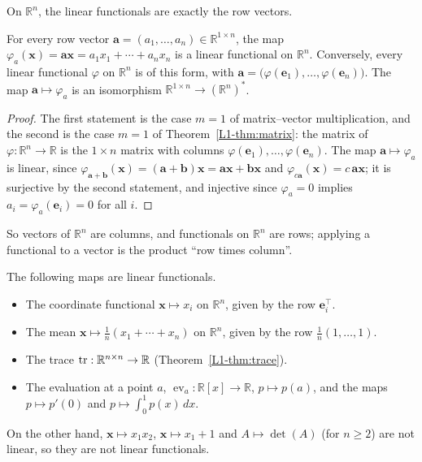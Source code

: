 On $\mathbb{R}^n$, the linear functionals are exactly the row vectors.

\begin{proposition}\label{L1-prop:functionals-rn}
    For every row vector $\mathbf{a} = (a_1, \ldots, a_n) \in \mathbb{R}^{1 \times n}$, the map $\varphi_a(\mathbf{x}) = \mathbf{a}\mathbf{x} = a_1 x_1 + \cdots + a_n x_n$ is a linear functional on $\mathbb{R}^n$. Conversely, every linear functional $\varphi$ on $\mathbb{R}^n$ is of this form, with $\mathbf{a} = \big(\varphi(\mathbf{e}_1), \ldots, \varphi(\mathbf{e}_n)\big)$. The map $\mathbf{a} \mapsto \varphi_a$ is an isomorphism $\mathbb{R}^{1 \times n} \to (\mathbb{R}^n)^*$.
\end{proposition}

\begin{proof}
    The first statement is the case $m = 1$ of matrix--vector multiplication, and the second is the case $m = 1$ of Theorem~\ref{L1-thm:matrix}: the matrix of $\varphi: \mathbb{R}^n \to \mathbb{R}$ is the $1 \times n$ matrix with columns $\varphi(\mathbf{e}_1), \ldots, \varphi(\mathbf{e}_n)$. The map $\mathbf{a} \mapsto \varphi_a$ is linear, since $\varphi_{\mathbf{a} + \mathbf{b}}(\mathbf{x}) = (\mathbf{a} + \mathbf{b})\mathbf{x} = \mathbf{a}\mathbf{x} + \mathbf{b}\mathbf{x}$ and $\varphi_{c\mathbf{a}}(\mathbf{x}) = c\,\mathbf{a}\mathbf{x}$; it is surjective by the second statement, and injective since $\varphi_a = 0$ implies $a_i = \varphi_a(\mathbf{e}_i) = 0$ for all $i$.
\end{proof}

So vectors of $\mathbb{R}^n$ are columns, and functionals on $\mathbb{R}^n$ are rows; applying a functional to a vector is the product ``row times column''.

\begin{example}\label{L1-ex:functionals}
    The following maps are linear functionals.
    \begin{itemize}
        \item The coordinate functional $\mathbf{x} \mapsto x_i$ on $\mathbb{R}^n$, given by the row $\mathbf{e}_i^\top$.
        \item The mean $\mathbf{x} \mapsto \frac{1}{n}(x_1 + \cdots + x_n)$ on $\mathbb{R}^n$, given by the row $\frac{1}{n}(1, \ldots, 1)$.
        \item The trace $\operatorname{tr}: \mathbb{R}^{n \times n} \to \mathbb{R}$ (Theorem~\ref{L1-thm:trace}).
        \item The evaluation at a point $a$, $\operatorname{ev}_a: \mathbb{R}[x] \to \mathbb{R}$, $p \mapsto p(a)$, and the maps $p \mapsto p'(0)$ and $p \mapsto \int_0^1 p(x)\, dx$.
    \end{itemize}
    On the other hand, $\mathbf{x} \mapsto x_1 x_2$, $\mathbf{x} \mapsto x_1 + 1$ and $A \mapsto \det(A)$ (for $n \geq 2$) are not linear, so they are not linear functionals.
\end{example}

